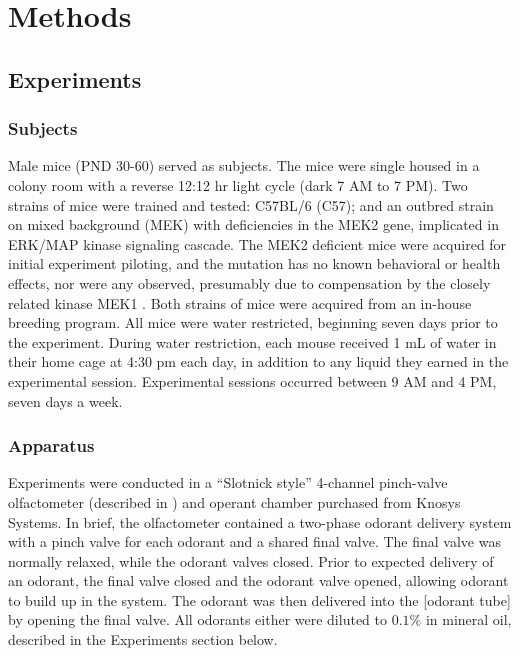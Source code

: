 \section{Methods}
\label{sec:methods}
\subsection{Experiments}

\subsubsection{Subjects}
\label{sec:methods_subjects}
Male mice (PND 30-60) served as subjects. The mice were single housed in a colony room with a reverse 12:12 hr light cycle (dark 7 AM to 7 PM). Two strains of mice were trained and tested: C57BL/6 (C57); and an outbred strain on mixed background (MEK) with deficiencies in the MEK2 gene, implicated in ERK/MAP kinase signaling cascade. The MEK2 deficient mice were acquired for initial experiment piloting, and the mutation has no known behavioral or health effects, nor were any observed, presumably due to compensation by the closely related kinase MEK1 \cite{12832465}. Both strains of mice were acquired from an in-house breeding program. All mice were water restricted, beginning seven days prior to the experiment. During water restriction, each mouse received 1 mL of water in their home cage at 4:30 pm each day, in addition to any liquid they earned in the experimental session. Experimental sessions occurred between 9 AM and 4 PM, seven days a week.

\subsubsection{Apparatus}
\label{sec:methods_apparatus}
Experiments were conducted in a ``Slotnick style'' 4-channel pinch-valve olfactometer (described in \cite{18428626}) and operant chamber purchased from Knosys Systems. In brief, the olfactometer contained a two-phase odorant delivery system with a pinch valve for each odorant and a shared final valve. The final valve was normally relaxed, while the odorant valves closed. Prior to expected delivery of an odorant, the final valve closed and the odorant valve opened, allowing odorant to build up in the system. The odorant was then delivered into the [odorant tube] by opening the final valve. All odorants either were diluted to $0.1\%$ in mineral oil, described in the Experiments section below.

